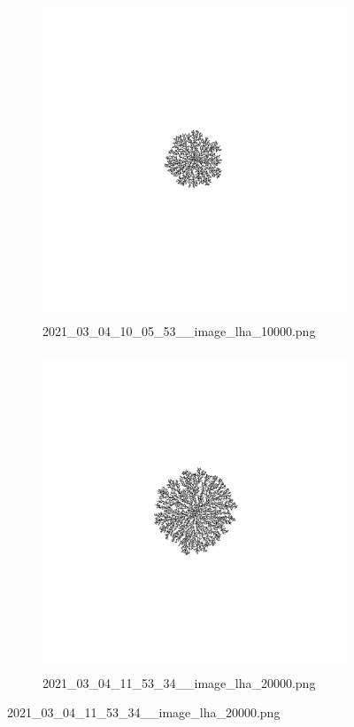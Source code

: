 \documentclass[12pt,a4paper]{scrartcl}
\newcommand{\1}{\mathbbm{1}}
\theoremstyle{definition}
\numberwithin{equation}{section}
\begin{document}
\begin{figure}[p]
	\centering
	\begin{subfigure}[]{0.48\textwidth}
		\centerline{\includegraphics[height=9.5cm]{images/ia/2021_03_04_10_05_53__image_lha_10000.png}}
		\captionsetup{labelformat=empty}
		\caption{2021\_03\_04\_10\_05\_53\_\_image\_lha\_10000.png} 
	\end{subfigure}
	\begin{subfigure}[]{0.48\textwidth}
		\centerline{\includegraphics[height=9.5cm]{images/ia/2021_03_04_11_53_34__image_lha_20000.png}}
		\captionsetup{labelformat=empty}
		\caption{2021\_03\_04\_11\_53\_34\_\_image\_lha\_20000.png} 
	\end{subfigure}
\end{figure}
\end{document}
